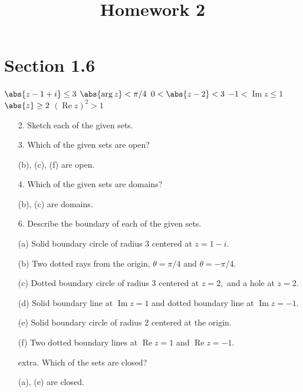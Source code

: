 \documentclass{article}
\DeclareMathOperator{\re}{Re}
\DeclareMathOperator{\im}{Im}
\begin{document}
\title{Homework 2}
\maketitle
\thispagestyle{fancy}

\section*{Section 1.6}

\begin{enumerate}[(a)]
		\ii $\abs{z-1+i}\le 3$
		\ii $\abs{\arg z} < \pi/4$
		\ii $0<\abs{z-2}<3$
		\ii $-1<\im z\le 1$
		\ii $\abs{z}\ge 2$
		\ii $(\re z)^2>1$
\end{enumerate}

\begin{itemize}
	\item[2.] Sketch each of the given sets.

	\item[3.] Which of the given sets are open?
		\begin{answer*}
			(b), (c), (f) are open.
		\end{answer*}

	\item[4.] Which of the given sets are domains?
		\begin{answer*}
			(b), (c) are domains.
		\end{answer*}

	\item[6.] Describe the boundary of each of the given sets.
		\begin{answer*}
			(a) Solid boundary circle of radius 3 centered at $z=1-i.$

			(b) Two dotted rays from the origin, $\theta=\pi/4$ and $\theta=-\pi/4.$

			(c) Dotted boundary circle of radius 3 centered at $z=2,$ and a hole at $z=2.$
			
			(d) Solid boundary line at $\im z=1$ and dotted boundary line at $\im z=-1.$

			(e) Solid boundary circle of radius 2 centered at the origin.

			(f) Two dotted boundary lines at $\re z = 1$ and $\re z = -1.$

		\end{answer*}

	\item[extra.] Which of the sets are closed?
		\begin{answer*}
			(a), (e) are closed.
		\end{answer*}
		
\end{itemize}
\end{document}
